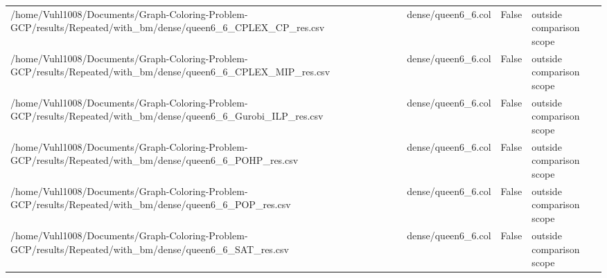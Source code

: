 \begin{table}[htbp]
\begin{tabular}{llll}
/home/Vuhl1008/Documents/Graph-Coloring-Problem-GCP/results/Repeated/with\_bm/dense/queen6\_6\_CPLEX\_CP\_res.csv & dense/queen6\_6.col & False & outside comparison scope \\
/home/Vuhl1008/Documents/Graph-Coloring-Problem-GCP/results/Repeated/with\_bm/dense/queen6\_6\_CPLEX\_MIP\_res.csv & dense/queen6\_6.col & False & outside comparison scope \\
/home/Vuhl1008/Documents/Graph-Coloring-Problem-GCP/results/Repeated/with\_bm/dense/queen6\_6\_Gurobi\_ILP\_res.csv & dense/queen6\_6.col & False & outside comparison scope \\
/home/Vuhl1008/Documents/Graph-Coloring-Problem-GCP/results/Repeated/with\_bm/dense/queen6\_6\_POHP\_res.csv & dense/queen6\_6.col & False & outside comparison scope \\
/home/Vuhl1008/Documents/Graph-Coloring-Problem-GCP/results/Repeated/with\_bm/dense/queen6\_6\_POP\_res.csv & dense/queen6\_6.col & False & outside comparison scope \\
/home/Vuhl1008/Documents/Graph-Coloring-Problem-GCP/results/Repeated/with\_bm/dense/queen6\_6\_SAT\_res.csv & dense/queen6\_6.col & False & outside comparison scope \\
\hline
\end{tabular}
\end{table}
